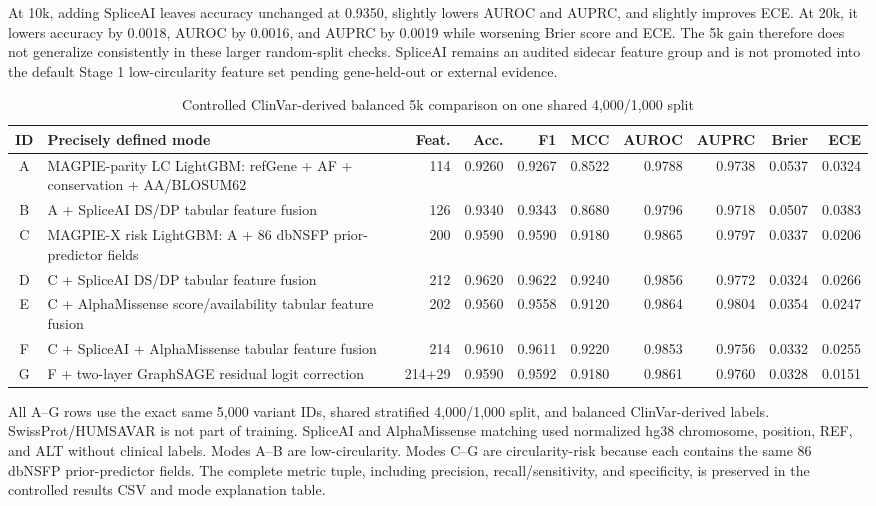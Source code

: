 \documentclass[conference]{IEEEtran}
\begin{document}
At 10k, adding SpliceAI leaves accuracy unchanged at 0.9350, slightly lowers AUROC and AUPRC, and slightly improves ECE. At 20k, it lowers accuracy by 0.0018, AUROC by 0.0016, and AUPRC by 0.0019 while worsening Brier score and ECE. The 5k gain therefore does not generalize consistently in these larger random-split checks. SpliceAI remains an audited sidecar feature group and is not promoted into the default Stage 1 low-circularity feature set pending gene-held-out or external evidence.

\begin{table}[t]
\centering
\scriptsize
\caption{Controlled ClinVar-derived balanced 5k comparison on one shared 4,000/1,000 split}
\label{tab:magpie-x-enhanced-5k}
\begin{tabular}{clrrrrrrrr}
\toprule
ID & Precisely defined mode & Feat. & Acc. & F1 & MCC & AUROC & AUPRC & Brier & ECE \\
\midrule
A & MAGPIE-parity LC LightGBM: refGene + AF + conservation + AA/BLOSUM62 & 114 & 0.9260 & 0.9267 & 0.8522 & 0.9788 & 0.9738 & 0.0537 & 0.0324 \\
B & A + SpliceAI DS/DP tabular feature fusion & 126 & 0.9340 & 0.9343 & 0.8680 & 0.9796 & 0.9718 & 0.0507 & 0.0383 \\
C & MAGPIE-X risk LightGBM: A + 86 dbNSFP prior-predictor fields & 200 & 0.9590 & 0.9590 & 0.9180 & 0.9865 & 0.9797 & 0.0337 & 0.0206 \\
D & C + SpliceAI DS/DP tabular feature fusion & 212 & 0.9620 & 0.9622 & 0.9240 & 0.9856 & 0.9772 & 0.0324 & 0.0266 \\
E & C + AlphaMissense score/availability tabular feature fusion & 202 & 0.9560 & 0.9558 & 0.9120 & 0.9864 & 0.9804 & 0.0354 & 0.0247 \\
F & C + SpliceAI + AlphaMissense tabular feature fusion & 214 & 0.9610 & 0.9611 & 0.9220 & 0.9853 & 0.9756 & 0.0332 & 0.0255 \\
G & F + two-layer GraphSAGE residual logit correction & 214+29 & 0.9590 & 0.9592 & 0.9180 & 0.9861 & 0.9760 & 0.0328 & 0.0151 \\
\bottomrule
\end{tabular}
\end{table}

All A--G rows use the exact same 5,000 variant IDs, shared stratified 4,000/1,000 split, and balanced ClinVar-derived labels. SwissProt/HUMSAVAR is not part of training. SpliceAI and AlphaMissense matching used normalized hg38 chromosome, position, REF, and ALT without clinical labels. Modes A--B are low-circularity. Modes C--G are circularity-risk because each contains the same 86 dbNSFP prior-predictor fields. The complete metric tuple, including precision, recall/sensitivity, and specificity, is preserved in the controlled results CSV and mode explanation table.
\end{document}
